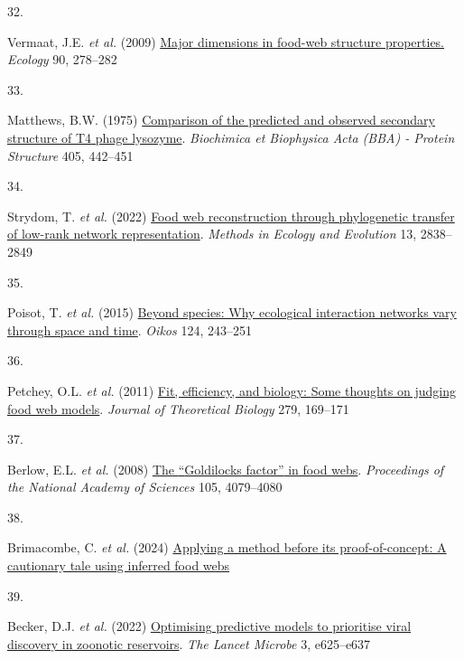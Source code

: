 \documentclass[
]{article}
\newlength{\cslhangindent}
\newlength{\csllabelwidth}
\newenvironment{CSLReferences}[2] %
 {\begin{list}{}{%
  \setlength{\itemindent}{0pt}
  \setlength{\leftmargin}{0pt}
  \setlength{\parsep}{0pt}
  \ifodd #1
   \setlength{\leftmargin}{\cslhangindent}
   \setlength{\itemindent}{-1\cslhangindent}
  \fi
  \setlength{\itemsep}{#2\baselineskip}}}
 {\end{list}}
\newcommand{\CSLLeftMargin}[1]{\parbox[t]{\csllabelwidth}{\strut#1\strut}}
\newcommand{\CSLRightInline}[1]{\parbox[t]{\linewidth - \csllabelwidth}{\strut#1\strut}}
\begin{document}
\begin{CSLReferences}{0}{0}
\CSLLeftMargin{32. }%
\CSLRightInline{Vermaat, J.E. \emph{et al.} (2009)
\href{https://www.ncbi.nlm.nih.gov/pubmed/19294932}{Major dimensions in
food-web structure properties.} \emph{Ecology} 90, 278--282}

\CSLLeftMargin{33. }%
\CSLRightInline{Matthews, B.W. (1975)
\href{https://doi.org/10.1016/0005-2795(75)90109-9}{Comparison of the
predicted and observed secondary structure of {T4} phage lysozyme}.
\emph{Biochimica et Biophysica Acta (BBA) - Protein Structure} 405,
442--451}

\CSLLeftMargin{34. }%
\CSLRightInline{Strydom, T. \emph{et al.} (2022)
\href{https://doi.org/10.1111/2041-210X.13835}{Food web reconstruction
through phylogenetic transfer of low-rank network representation}.
\emph{Methods in Ecology and Evolution} 13, 2838--2849}

\CSLLeftMargin{35. }%
\CSLRightInline{Poisot, T. \emph{et al.} (2015)
\href{https://doi.org/10.1111/oik.01719}{Beyond species: Why ecological
interaction networks vary through space and time}. \emph{Oikos} 124,
243--251}

\CSLLeftMargin{36. }%
\CSLRightInline{Petchey, O.L. \emph{et al.} (2011)
\href{https://doi.org/10.1016/j.jtbi.2011.03.019}{Fit, efficiency, and
biology: {Some} thoughts on judging food web models}. \emph{Journal of
Theoretical Biology} 279, 169--171}

\CSLLeftMargin{37. }%
\CSLRightInline{Berlow, E.L. \emph{et al.} (2008)
\href{https://doi.org/10.1073/pnas.0800967105}{The {``{Goldilocks}
factor''} in food webs}. \emph{Proceedings of the National Academy of
Sciences} 105, 4079--4080}

\CSLLeftMargin{38. }%
\CSLRightInline{Brimacombe, C. \emph{et al.} (2024)
\href{https://doi.org/10.13140/RG.2.2.22076.65927}{Applying a method
before its proof-of-concept: {A} cautionary tale using inferred food
webs}}

\CSLLeftMargin{39. }%
\CSLRightInline{Becker, D.J. \emph{et al.} (2022)
\href{https://doi.org/10.1016/S2666-5247(21)00245-7}{Optimising
predictive models to prioritise viral discovery in zoonotic reservoirs}.
\emph{The Lancet Microbe} 3, e625--e637}


\end{CSLReferences}
\end{document}

